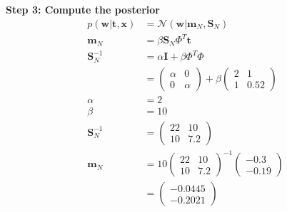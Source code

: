 \documentclass[paper=a4, fontsize=10pt]{scrartcl} %
\numberwithin{equation}{section} %
\numberwithin{figure}{section} %
\numberwithin{table}{section} %
\begin{document}
\begin{enumerate}
			\textbf{Step 3: Compute the posterior}
			\begin{align}
				p(\boldsymbol w \vert \boldsymbol t, \boldsymbol x) &= \mathcal{N}(\boldsymbol w \vert \boldsymbol m_N, \boldsymbol S_N)\\
				\boldsymbol m_N &= \beta \boldsymbol S_N \Phi^T \boldsymbol t\\
				\boldsymbol S_N^{-1} &= \alpha \boldsymbol I + \beta \Phi^T\Phi\\
								 &= \begin{pmatrix}
								 		\alpha & 0\\
								 		0 & \alpha
								 	\end{pmatrix} + 
								 	\beta \begin{pmatrix}
								 				2 & 1\\
								 				1 & 0.52
								 		  \end{pmatrix}\\
				\alpha &= 2\\
				\beta &= 10\\
				\boldsymbol S_N^{-1} &= \begin{pmatrix}
											22 & 10\\
											10 & 7.2
										  \end{pmatrix}\\
				\boldsymbol m_N &= 10 \begin{pmatrix}
											22 & 10\\
											10 & 7.2
										\end{pmatrix}^{-1}
										\begin{pmatrix}
											-0.3\\
											-0.19
										\end{pmatrix}\\
								 &= \begin{pmatrix}
								 		-0.0445\\
								 		-0.2021
								 	\end{pmatrix}
			\end{align}


\end{enumerate}
\end{document}
